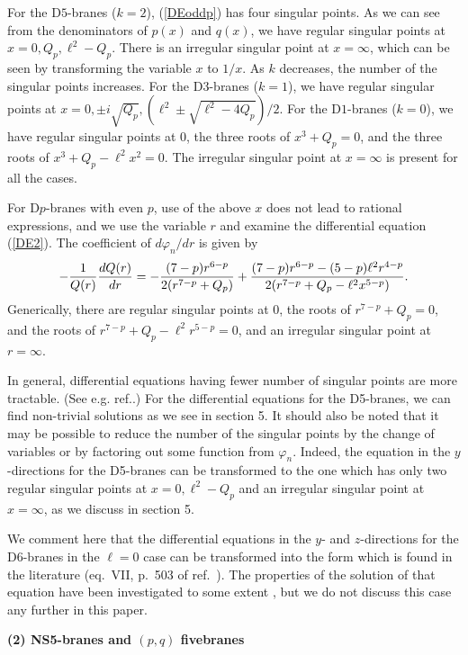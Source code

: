 \documentclass[a4paper,12pt]{article}
\begin{document}
For the D$5$-branes ($k=2$), (\ref{DEoddp}) has four 
singular points.
As we can see from the denominators of $p(x)$ and $q(x)$,
we have regular singular points at $x=0,Q_p, \ell^2-Q_p$. 
There is an irregular singular point at $x=\infty$,
which can be seen by transforming  the variable $x$ to $1/x$.
As $k$ decreases, the number of the singular points increases.
For the D$3$-branes ($k=1$), we have regular 
singular points at $x=0,\pm i \sqrt{Q_p}, 
(\ell^2\pm\sqrt{\ell^2-4Q_p})/2$.
For the D$1$-branes ($k=0$), we have regular 
singular points at $0$, the three roots of $x^3+Q_p=0$, 
and the three roots of $x^3+Q_p-\ell^2x^2=0$.
The irregular singular point at $x=\infty$ is present for 
all the cases.

For D$p$-branes with even $p$, use of the above $x$ does
not lead to rational expressions, and we use the 
variable $r$ and examine the differential equation
(\ref{DE2}). The coefficient of $d\varphi_{n}/dr$ is
given by
\begin{equation}
-{1\over Q(r)}{dQ(r)\over dr}=
-{(7-p) r^{6-p}\over 2(r^{7-p}+Q_p)}
+{(7-p)r^{6-p}-(5-p)\ell^2 r^{4-p}\over
2(r^{7-p}+Q_p-\ell^2 x^{5-p})}.
\end{equation}
Generically, there are regular
singular points at $0$, the roots of $r^{7-p}+Q_{p}=0$,
and the roots of $r^{7-p}+Q_p-\ell^2 r^{5-p}=0$, and
an irregular singular point at $r=\infty$. 

In general, differential equations having fewer number
of singular points are more tractable. (See e.g. 
ref.\cite{In}.) For the differential equations 
for the D5-branes, we can find non-trivial solutions 
as we see in section 5.
It should also be noted that it may be possible to
reduce the number of the singular points 
by the change of variables or by factoring out
some function from $\varphi_{n}$.
Indeed, the equation in the $y$-directions for the  
D5-branes can be transformed to the one which has only 
two regular singular points at $x=0, \ell^2-Q_p$ and
an irregular singular point at $x=\infty$, as we discuss
in section 5. 

We comment here that the differential equations 
in the $y$- and $z$-directions for the D$6$-branes
in the $\ell=0$ case can be transformed into the
form which is found in the literature (eq.~VII, p.~503 
of ref.~\cite{In}). The properties of the solution 
of that equation have been  investigated to some 
extent \cite{In2}, but we do not discuss
this case any further in this paper.
\medskip

\noindent
{\bf (2) NS5-branes and $(p,q)$ fivebranes}
\medskip
\end{document}
